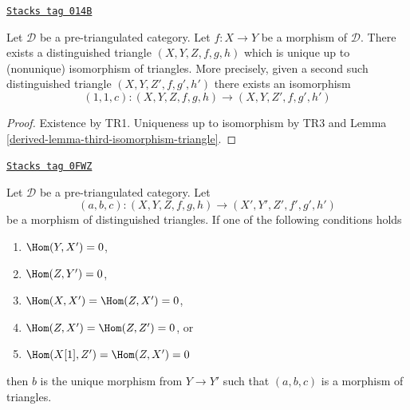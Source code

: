\begin{lemma}
\label{derived-lemma-cone-triangle-unique-isomorphism}
\href{https://stacks.math.columbia.edu/tag/014B}{\texttt{Stacks tag 014B}}

Let $\mathcal{D}$ be a pre-triangulated category.
Let $f : X \to Y$ be a morphism of $\mathcal{D}$.
There exists a distinguished triangle $(X, Y, Z, f, g, h)$ which
is unique up to (nonunique) isomorphism of triangles.
More precisely, given a second such distinguished triangle
$(X, Y, Z', f, g', h')$ there exists an isomorphism
$$
(1, 1, c) : (X, Y, Z, f, g, h) \longrightarrow (X, Y, Z', f, g', h')
$$
\end{lemma}

\begin{proof}

Existence by TR1. Uniqueness up to isomorphism by TR3 and
Lemma \ref{derived-lemma-third-isomorphism-triangle}.
\end{proof}

\begin{lemma}
\label{derived-lemma-uniqueness-third-arrow}
\href{https://stacks.math.columbia.edu/tag/0FWZ}{\texttt{Stacks tag 0FWZ}}

Let $\mathcal{D}$ be a pre-triangulated category. Let
$$
(a, b, c) : (X, Y, Z, f, g, h) \to (X', Y', Z', f', g', h')
$$
be a morphism of distinguished triangles. If one of the following
conditions holds
\begin{enumerate}
\item $\Hom(Y, X') = 0$,
\item $\Hom(Z, Y') = 0$,
\item $\Hom(X, X') = \Hom(Z, X') = 0$,
\item $\Hom(Z, X') = \Hom(Z, Z') = 0$, or
\item $\Hom(X[1], Z') = \Hom(Z, X') = 0$
\end{enumerate}
then $b$ is the unique morphism from $Y \to Y'$ such that
$(a, b, c)$ is a morphism of triangles.
\end{lemma}

